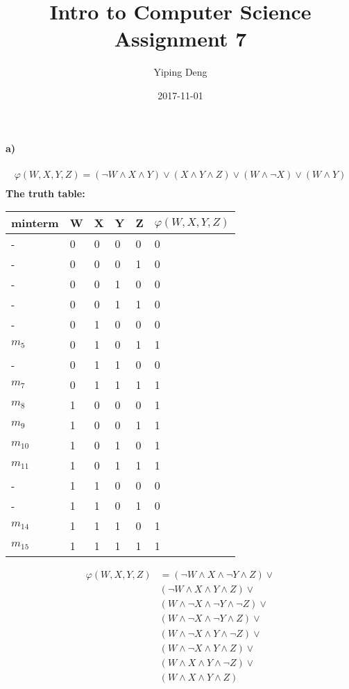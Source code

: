 \documentclass{article}
\title{Intro to Computer Science Assignment 7}
\date{2017-11-01}
\author{Yiping Deng}
\begin{document}
\maketitle
\paragraph{a)}
\begin{align*}
    \varphi(W, X, Y, Z) = (\neg W \land X \land Y) \lor
    (X \land Y \land Z) \lor
    (W \land \neg X) \lor
    (W \land Y) \\
\end{align*}
\textbf{The truth table:} \\
\begin{tabular}{ | p{2cm} | p{1cm} | p{1cm} | p{1cm} | p{1cm} | p{3cm} |}
    \hline
    minterm & W & X & Y & Z & $\varphi(W, X, Y, Z)$ \\
    \hline
    - & 0 & 0 & 0 & 0 & 0 \\
    - & 0 & 0 & 0 & 1 & 0 \\
    - & 0 & 0 & 1 & 0 & 0 \\
    - & 0 & 0 & 1 & 1 & 0 \\
    - & 0 & 1 & 0 & 0 & 0 \\
    $m_5$ & 0 & 1 & 0 & 1 & 1 \\
    - & 0 & 1 & 1 & 0 & 0 \\
    $m_7$ & 0 & 1 & 1 & 1 & 1 \\
    $m_8$ & 1 & 0 & 0 & 0 & 1 \\
    $m_9$ & 1 & 0 & 0 & 1 & 1 \\
    $m_{10}$ & 1 & 0 & 1 & 0 & 1 \\
    $m_{11}$ & 1 & 0 & 1 & 1 & 1 \\
    - & 1 & 1 & 0 & 0 & 0 \\
    - & 1 & 1 & 0 & 1 & 0 \\
    $m_{14}$ & 1 & 1 & 1 & 0 & 1 \\
    $m_{15}$ & 1 & 1 & 1 & 1 & 1 \\
    \hline
\end{tabular}
\begin{align*}
    \varphi(W, X, Y, Z) &= (\neg W \land X \land \neg Y \land Z) \lor \\
    &(\neg W \land X \land Y \land Z) \lor \\
    &(W \land \neg X \land \neg Y \land \neg Z) \lor \\
    &(W \land \neg X \land \neg Y \land Z) \lor \\
    &(W \land \neg X \land Y \land \neg Z) \lor \\
    &(W \land \neg X \land Y \land Z) \lor \\
    &(W \land X \land Y \land \neg Z) \lor \\
    &(W \land X \land Y \land Z) \\
\end{align*}
\end{document}
